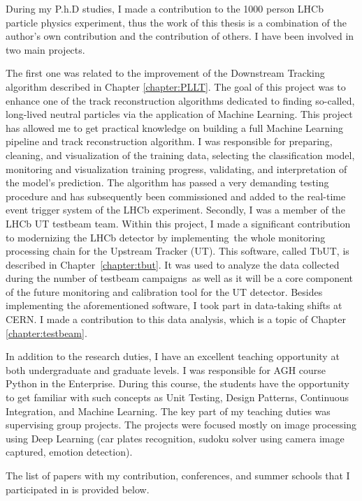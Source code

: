 During my P.h.D studies, I made a contribution to the 1000 person LHCb particle physics experiment, thus the work of this thesis is a combination of the author's own contribution and the contribution of others. I have been involved in two main projects.

The first one was related to the improvement of the Downstream Tracking algorithm described in Chapter \ref{chapter:PLLT}. The goal of this project was to enhance one of the track reconstruction algorithms dedicated to finding so-called, long-lived neutral particles via the application of Machine Learning. This project has allowed me to get practical knowledge on building a full Machine Learning pipeline and track reconstruction algorithm. I was responsible for preparing, cleaning, and visualization of the training data, selecting the classification model, monitoring and visualization training progress, validating, and interpretation of the model’s prediction. The algorithm has passed a very demanding testing procedure and has subsequently been commissioned and added to the real-time event trigger system of the LHCb experiment.
Secondly, I was a member of the LHCb UT testbeam team. Within this project, I made a significant contribution to modernizing the LHCb detector by implementing the whole monitoring processing chain for the Upstream Tracker (UT). This software, called TbUT, is described in Chapter~\ref{chapter:tbut}. It was used to analyze the data collected during the number of testbeam campaigns as well as it will be a core component of the future monitoring and calibration tool for the UT detector. Besides implementing the aforementioned software, I took part in data-taking shifts at CERN. I made a contribution to this data analysis, which is a topic of Chapter \ref{chapter:testbeam}.

In addition to the research duties, I have an excellent teaching opportunity at both undergraduate and graduate levels. I was responsible for AGH course Python in the Enterprise. During this course, the students have the opportunity to get familiar with such concepts as Unit Testing, Design Patterns, Continuous Integration, and Machine Learning. The key part of my teaching duties was supervising group projects. The projects were focused mostly on image processing using Deep Learning (car plates recognition, sudoku solver using camera image captured, emotion detection).

The list of papers with my contribution, conferences, and summer schools that I participated in is provided below. 

